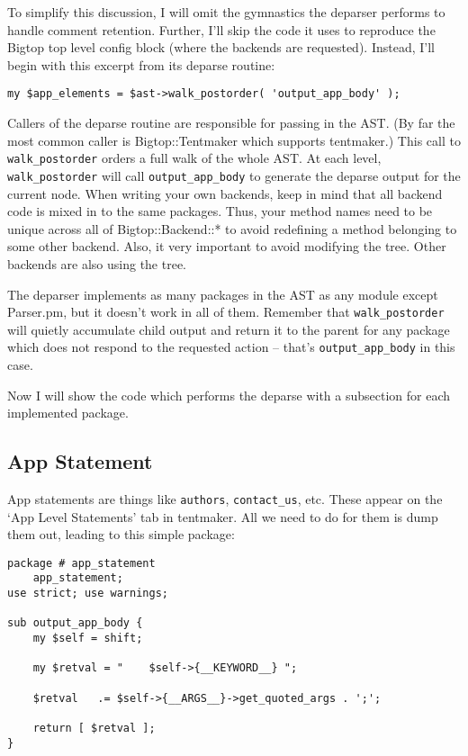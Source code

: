 To simplify this discussion, I will omit the gymnastics the deparser
performs to handle comment retention.  Further, I'll skip the code
it uses to reproduce the Bigtop top level config block (where the backends
are requested).  Instead, I'll begin with this excerpt from its deparse
routine:

\begin{verbatim}
my $app_elements = $ast->walk_postorder( 'output_app_body' );
\end{verbatim}

Callers of the deparse routine are responsible for passing in the AST.
(By far the most common caller is Bigtop::Tentmaker which supports tentmaker.)
This call to \verb+walk_postorder+ orders a full walk of the whole AST.
At each level, \verb+walk_postorder+ will call \verb+output_app_body+
to generate the deparse output for the current node.  When writing your
own backends, keep in mind that all backend code is mixed in to the
same packages.  Thus, your method names need to be unique across all
of Bigtop::Backend::* to avoid redefining a method belonging to some
other backend.  Also, it very important to avoid modifying the tree.
Other backends are also using the tree.

The deparser implements as many packages in the AST as any module
except Parser.pm, but it doesn't work in all of them.  Remember
that \verb+walk_postorder+ will quietly accumulate child output and
return it to the parent for any package which does not respond
to the requested action -- that's \verb+output_app_body+ in this case.

Now I will show the code which performs the deparse with a subsection for
each implemented package.

\subsection*{App Statement}

App statements are things like \verb+authors+, \verb+contact_us+, etc.
These appear on the `App Level Statements' tab in tentmaker.  All we
need to do for them is dump them out, leading to this simple package:

\begin{verbatim}
package # app_statement
    app_statement;
use strict; use warnings;

sub output_app_body {
    my $self = shift;

    my $retval = "    $self->{__KEYWORD__} ";

    $retval   .= $self->{__ARGS__}->get_quoted_args . ';';

    return [ $retval ];
}
\end{verbatim}

